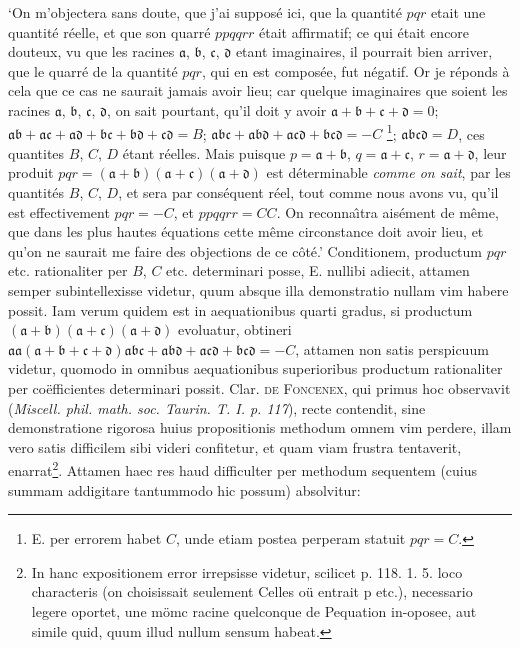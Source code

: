 \documentclass[14pt]{memoir}
\theoremstyle{plain}
\theoremstyle{remark}
\begin{document}
`On m'objectera sans doute, que j'ai suppos\'e ici, que la quantit\'e \(pqr\) etait une quantit\'e r\'eelle, et que son quarr\'e \(ppqqrr\) \'etait affirmatif; ce qui \'etait encore douteux, vu que les racines \(\mathfrak{a}\), \(\mathfrak{b}\), \(\mathfrak{c}\), \(\mathfrak{d}\) etant imaginaires, il pourrait bien arriver, que le quarr\'e de la quantit\'e \(pqr\), qui en est compos\'ee, fut n\'egatif. Or je r\'eponds \`a cela que ce cas ne saurait jamais avoir lieu; car quelque imaginaires que soient les racines \(\mathfrak{a}\), \(\mathfrak{b}\), \(\mathfrak{c}\), \(\mathfrak{d}\), on sait pourtant, qu'il doit y avoir \(\mathfrak{a} + \mathfrak{b} + \mathfrak{c} + \mathfrak{d} = 0 \); \(\mathfrak{a}\mathfrak{b} + \mathfrak{a}\mathfrak{c} + \mathfrak{a}\mathfrak{d} + \mathfrak{b}\mathfrak{c} + \mathfrak{b}\mathfrak{d} + \mathfrak{c}\mathfrak{d} = B\); \(\mathfrak{a}\mathfrak{b}\mathfrak{c}+\mathfrak{a}\mathfrak{b}\mathfrak{d}+\mathfrak{a}\mathfrak{c}\mathfrak{d}+\mathfrak{b}\mathfrak{c}\mathfrak{d} = -C\) \footnote{\textsc{E.} per errorem habet \(C\), unde etiam postea perperam statuit \(pqr = C\).}; \(\mathfrak{a}\mathfrak{b}\mathfrak{c}\mathfrak{d}=D\), ces quantites \(B\), \(C\), \(D\) \'etant r\'eelles. Mais puisque \(p = \mathfrak{a} + \mathfrak{b}\), \(q =\mathfrak{a} + \mathfrak{c}\), \(r = \mathfrak{a} + \mathfrak{d}\), leur produit \(pqr = (\mathfrak{a} + \mathfrak{b})(\mathfrak{a} + \mathfrak{c})(\mathfrak{a} + \mathfrak{d})\) est d\'eterminable \textit{comme on sait}, par les quantit\'es \(B\), \(C\), \(D\), et sera par cons\'equent r\'eel, tout comme nous avons vu, qu'il est effectivement \(pqr = -C\), et \(ppqqrr = CC\). On reconna\^{\i}tra ais\'ement de m\^eme, que dans les plus hautes \'equations cette m\^eme circonstance doit avoir lieu, et qu'on ne saurait me faire des objections de ce c\^ot\'e.'  Conditionem, productum \(pqr\) etc. rationaliter per \(B\), \(C\) etc. determinari posse, \textsc{E.} nullibi adiecit, attamen semper subintellexisse videtur, quum absque illa demonstratio nullam vim habere possit.  Iam verum quidem est in aequationibus quarti gradus, si productum \( (\mathfrak{a} + \mathfrak{b})(\mathfrak{a} + \mathfrak{c})(\mathfrak{a} + \mathfrak{d})\) evoluatur, obtineri \( \mathfrak{a}\mathfrak{a}(\mathfrak{a} + \mathfrak{b} + \mathfrak{c} + \mathfrak{d}) \mathfrak{a}\mathfrak{b}\mathfrak{c}+\mathfrak{a}\mathfrak{b}\mathfrak{d}+\mathfrak{a}\mathfrak{c}\mathfrak{d}+\mathfrak{b}\mathfrak{c}\mathfrak{d}= - C\), attamen non satis perspicuum videtur, quomodo in omnibus aequationibus superioribus productum rationaliter per co\"efficientes determinari possit. Clar. \textsc{de Foncenex}, qui primus hoc observavit (\textit{Miscell. phil. math. soc. Taurin. T. I. p. 117}), recte contendit, sine demonstratione rigorosa huius propositionis methodum omnem vim perdere, illam vero satis difficilem sibi videri confitetur, et quam viam frustra tentaverit, enarrat\footnote{In hanc expositionem error irrepsisse videtur, scilicet p. 118. 1. 5. loco characteris (on choisissait seulement Celles oü entrait p etc.), necessario legere oportet, une mömc racine quelconque de Pequation in-oposee, aut simile quid, quum illud nullum sensum habeat.}. Attamen haec res haud difficulter per methodum sequentem (cuius summam addigitare tantummodo hic possum) absolvitur: 
\end{document}
